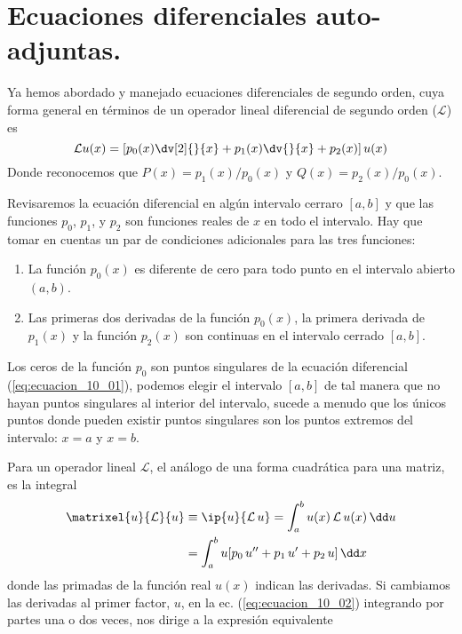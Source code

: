\section{Ecuaciones diferenciales auto-adjuntas.}
Ya hemos abordado y manejado ecuaciones diferenciales de segundo orden, cuya forma general en términos de un operador lineal diferencial de segundo orden ($\mathcal{L}$) es
\begin{equation}
\mathcal{L} u(x) = \left[ p_{0}(x) \dv[2]{}{x} + p_{1}(x) \dv{}{x} + p_{2}(x) \right]  u(x)
\label{eq:ecuacion_10_01}
\end{equation}
Donde reconocemos que $P(x) = p_{1}(x)/p_{0}(x)$ y $Q(x)= p_{2}(x)/p_{0}(x)$.
\par
Revisaremos la ecuación diferencial en algún intervalo cerraro $[a,b]$ y que las funciones $p_{0}$, $p_{1}$, y $p_{2}$ son funciones reales de $x$ en todo el intervalo. Hay que tomar en cuentas un par de condiciones adicionales para las tres funciones:
\begin{enumerate}
\item La función $p_{0}(x)$ es diferente de cero para todo punto en el intervalo abierto $(a,b)$.
\item Las primeras dos derivadas de la función $p_{0}(x)$, la primera derivada de $p_{1}(x)$ y la función $p_{2}(x)$ son continuas en el intervalo cerrado $[a,b]$.
\end{enumerate}
Los ceros de la función $p_{0}$ son puntos singulares de la ecuación diferencial (\ref{eq:ecuacion_10_01}), podemos elegir el intervalo $[a,b]$ de tal manera que no hayan puntos singulares al interior del intervalo, sucede a menudo que los únicos puntos donde pueden existir puntos singulares son los puntos extremos del intervalo: $x = a$ y $x = b$.
\par
Para un operador lineal $\mathcal{L}$, el análogo de una forma cuadrática para una matriz, es la integral
\begin{align}
\begin{aligned}
\matrixel{u}{\mathcal{L}}{u} &\equiv \ip{u}{\mathcal{L} \, u} = \int_{a}^{b} u(x) \, \mathcal{L} \, u(x) \, \dd u \\
&= \int_{a}^{b} u [ p_{0} \, u^{\prime \prime} + p_{1} \, u^{\prime} + p_{2} \, u ] \, \dd x
\end{aligned}
\label{eq:ecuacion_10_02}
\end{align}
donde las primadas de la función real $u(x)$ indican las derivadas. Si cambiamos las derivadas al primer factor, $u$, en la ec. (\ref{eq:ecuacion_10_02}) integrando por partes una o dos veces, nos dirige a la expresión equivalente
